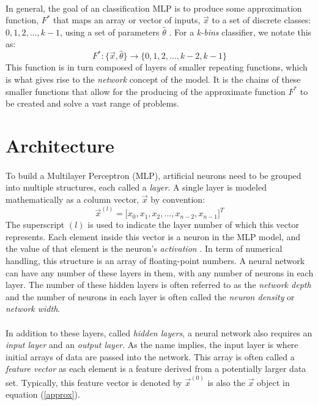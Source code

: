 \documentclass[12pt,letterpaper]{article}
\begin{document}
\paragraph*{}In general, the goal of an classification MLP is to produce some approximation function, $F^*$ that maps an array or vector of inputs, 
$\vec{x}$ to a set of discrete classes: $0,1,2,...,k-1$, using a set of parameters $\hat{\theta}$ \cite{Geron,Goodfellow,Petrik}. For a \textit{k-bins} classifier, we notate this as:
\begin{equation}
\label{approx}
F^* : \big\{ \vec{x},\hat{\theta}\big\} \rightarrow \big\{ 0,1,2,...,k-2,k-1 \big\}
\end{equation}
This function is in turn composed of layers of smaller repeating functions, which is what gives rise to the \textit{network} concept of the model. It is the chains of these smaller functions that allow for the producing of the approximate function $F^*$ to be created and solve a vast range of problems.



\section*{Architecture}
\paragraph*{}To build a Multilayer Perceptron (MLP), artificial neurons need to be grouped into multiple structures, each called a \textit{layer}. A single layer is modeled mathematically as a column vector, $\vec{x}$ by convention:
\begin{equation}
\label{layer}
\vec{x}^{(l)} = \big[ x_0 , x_1 , x_2 , ... , x_{n-2} , x_{n-1} \big]^T
\end{equation}
The superscript $(l)$ is used to indicate the layer number of which this vector represents. Each element inside this vector is a neuron in the MLP model, and the value of that element is the neuron's \textit{activation} \cite{Geron}. In term of numerical handling, this structure is an array of floating-point numbers. A neural network can have any number of these layers in them, with any number of neurons in each layer. The number of these hidden layers is often referred to as the \textit{network depth} and the number of neurons in each layer is often called the \textit{neuron density} or \textit{network width}.

\paragraph*{}In addition to these layers, called \textit{hidden layers}, a neural network also requires an \textit{input layer} and an \textit{output layer}\cite{Goodfellow}. As the name implies, the input layer is where initial arrays of data are passed into the network. This array is often called a \textit{feature vector} as each element is a feature derived from a potentially larger data set. Typically, this feature vector is denoted by 
$\vec{x}^{(0)}$ is also the $\vec{x}$ object in equation (\ref{approx}). 
\end{document}
